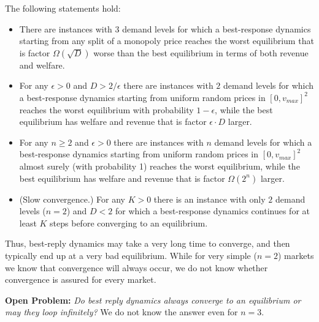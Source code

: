 \begin{theorem}
	The following statements hold:
	\begin{itemize}
		\item There are instances with $3$ demand levels for which a best-response dynamics starting from any split of a monopoly price reaches the worst equilibrium that
		is factor $\Omega(\sqrt{D})$ worse than the best equilibrium in terms of both revenue and welfare.
		
		\item For any $\epsilon>0$ and $D>2/\epsilon$  there are instances with $2$ demand levels for which a best-response dynamics starting from uniform random prices in $[0,v_{max}]^2$ reaches the worst equilibrium with probability $1-\epsilon$, while the best equilibrium has welfare and revenue that is factor $\epsilon\cdot D$ larger.
		
		\item For any $n\geq 2$ and $\epsilon>0$ there are instances with $n$ demand levels for which a best-response dynamics starting from uniform random prices in $[0,v_{max}]^2$ almost surely (with probability 1) reaches the worst equilibrium, while the best equilibrium has welfare and revenue that is factor $\Omega(2^n)$ larger.
			
		\item (Slow convergence.) For any $K>0$ there is an instance with only $2$ demand levels ($n=2$) and $D<2$ for which a best-response dynamics continues for at least $K$ steps before converging to an equilibrium.
	\end{itemize}
\end{theorem}


Thus, best-reply dynamics may take a very long time to converge, and then typically end up at a very bad equilibrium.
While for very simple ($n=2$) markets we know that convergence will always occur, we do not know whether convergence
is assured for every market.

\vspace{0.1in}
\noindent
{\bf Open Problem:} {\em Do best reply dynamics always converge to an equilibrium or may
they loop infinitely? }  We do not know the answer even for $n=3$.
\vspace{0.1in}



